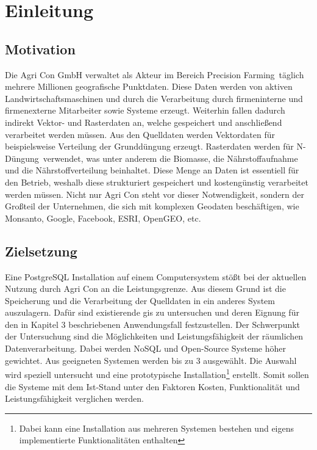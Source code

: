 \chapter{Einleitung}


\section{Motivation}

Die Agri Con GmbH verwaltet als Akteur im Bereich \glqq Precision Farming\grqq\ täglich mehrere Millionen geografische Punktdaten. Diese Daten werden von aktiven Landwirtschaftsmaschinen und durch die Verarbeitung durch firmeninterne und firmenexterne Mitarbeiter sowie Systeme erzeugt. Weiterhin fallen dadurch indirekt Vektor- und Rasterdaten an, welche gespeichert und anschließend verarbeitet werden müssen.
Aus den Quelldaten werden Vektordaten für beispielsweise Verteilung der Grunddüngung erzeugt. Rasterdaten werden für \glqq N-Düngung\grqq\  verwendet, was unter anderem die Biomasse, die Nährstoffaufnahme und die Nährstoffverteilung beinhaltet.
Diese Menge an Daten ist essentiell für den Betrieb, weshalb diese strukturiert gespeichert und kostengünstig verarbeitet werden müssen. Nicht nur Agri Con steht vor dieser Notwendigkeit, sondern der Großteil der Unternehmen, die sich mit komplexen Geodaten beschäftigen, wie Monsanto, Google, Facebook, ESRI, OpenGEO, etc.




\section{Zielsetzung}
Eine PostgreSQL Installation auf einem Computersystem stößt bei der aktuellen Nutzung durch Agri Con an die Leistungsgrenze.
Aus diesem Grund ist die Speicherung und die Verarbeitung der Quelldaten in ein anderes System auszulagern.
Dafür sind existierende \Gls{gis} zu untersuchen und deren Eignung für den in Kapitel 3 beschriebenen Anwendungsfall festzustellen. Der Schwerpunkt der Untersuchung sind die Möglichkeiten und Leistungsfähigkeit der räumlichen Datenverarbeitung.
Dabei werden NoSQL und Open-Source Systeme höher gewichtet.
Aus geeigneten Systemen werden bis zu 3 ausgewählt. Die Auswahl wird speziell untersucht und eine prototypische Installation\footnote{Dabei kann eine Installation aus mehreren Systemen bestehen und eigens implementierte Funktionalitäten enthalten} erstellt.
Somit sollen die Systeme mit dem Ist-Stand unter den Faktoren Kosten, Funktionalität und Leistungsfähigkeit verglichen werden.


